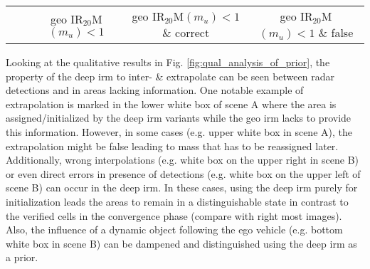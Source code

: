 \begin{center}
\begin{tabular}{c|c|ccc|ccc|ccc}
\hline
	& & \multicolumn{3}{c|}{\scriptsize{geo IR$_{20}$M$(m_u) < 1$}} & \multicolumn{3}{c|}{\scriptsize{geo IR$_{20}$M$(m_u) < 1$ \& correct}} & \multicolumn{3}{c}{\scriptsize{geo IR$_{20}$M$(m_u) < 1$ \& false}} 
\end{tabular}
\end{center}
Looking at the qualitative results in Fig. \ref{fig:qual_analysis_of_prior}, the property of the deep \gls{irm} to inter- \& extrapolate can be seen between radar detections and in areas lacking information. One notable example of extrapolation is marked in the lower white box of scene A where the area is assigned/initialized by the deep \gls{irm} variants while the geo \gls{irm} lacks to provide this information. However, in some cases (e.g. upper white box in scene A), the extrapolation might be false leading to mass that has to be reassigned later. Additionally, wrong interpolations (e.g. white box on the upper right in scene B) or even direct errors in presence of detections (e.g. white box on the upper left of scene B) can occur in the deep \gls{irm}. In these cases, using the deep \gls{irm} purely for initialization leads the areas to remain in a distinguishable state in contrast to the verified cells in the convergence phase (compare with right most images). Also, the influence of a dynamic object following the ego vehicle (e.g. bottom white box in scene B) can be dampened and distinguished using the deep \gls{irm} as a prior.
\begin{center}
\end{center}
%

